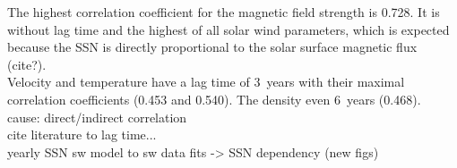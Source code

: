 The highest correlation coefficient for the magnetic field strength is 0.728. It is without lag time and the highest of all solar wind parameters, which is expected because the SSN is directly proportional to the solar surface magnetic flux (cite?).\\
Velocity and temperature have a lag time of 3~years with their maximal correlation coefficients (0.453 and 0.540). The density even 6~years (0.468).\\

cause: direct/indirect correlation\\
cite literature to lag time...\\

yearly SSN sw model to sw data fits -> SSN dependency (new figs)\\

